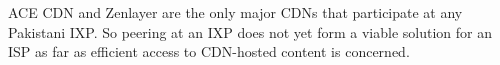 \documentclass[sigconf,anonymous,10pt]{acmart}
\begin{document}
ACE CDN and Zenlayer are the only major CDNs that participate at any Pakistani IXP. So peering at an IXP does not yet form a viable solution for an ISP as far as efficient access to CDN-hosted content is concerned.



\end{document}
